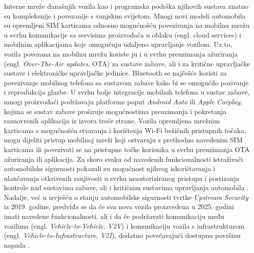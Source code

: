 \documentclass[times, utf8, diplomski, numeric]{fer}
\begin{document}
Interne mreže današnjih vozila kao i programska podrška njihovih sustava znatno su kompleksnije i povezanije s vanjskim svijetom\cite{huq2020driving}. Mnogi novi modeli automobila su opremljeni SIM karticama odnosno mogućnošću povezivanja na mobilnu mrežu u svrhu komunikacije sa servisima proizvođača u oblaku (engl. cloud services) i mobilnim aplikacijama koje omogućuju udaljeno upravljanje vozilom. Uz to, vozila povezana na mobilnu mrežu koriste ju i u svrhu preuzimanja ažuriranja (engl. \textit{Over-The-Air updates}, OTA) za sustave zabave, ali i za kritične upravljačke sustave i elektroničke upravljačke jedinice. Bluetooth se najčešće koristi za povezivanje mobilnog telefona sa sustavom zabave kako bi se omogućilo pozivanje i reprodukcija glazbe. U svrhu bolje integracije mobilnih telefona u sustav zabave, mnogi proizvođači podržavaju platforme poput \textit{Android Auto} ili \textit{Apple Carplay}, kojima se sustav zabave proširuje mogućnostima preuzimanja i pokretanja raznovrsnih aplikacija iz izvora treće strane. Vozila opremljena mrežnim karticama s mogućnošću stvaranja i korištenja Wi-Fi bežičnih pristupnih točaka, mogu dijeliti pristup mobilnoj mreži koji ostvaruju s prethodno navedenim SIM karticama ili povezivati se na pristupne točke korisnika u svrhu preuzimanja OTA ažuriranja ili aplikacija. Za skoro svaku od navedenih funkcionalnosti istraživači automobilske sigurnosti pokazali su mogućnost njihvog iskorištavanja i ulančavanja otkrivenih ranjivosti u svrhu neautoriziranog pristupa i postizanja kontrole nad sustavima zabave, ali i kritičnim sustavima upravljanja automobila \cite{nie2017free, nie2018over, cai20190, tencent2018bmw, miller2015remote, curry2023web}. Nadalje, već u izvješću o stanju automobilske sigurnosti tvrtke \textit{Upstream Security} iz 2019. godine, predviđa se da će sva nova vozila proizvedena u 2025. godini imati navedene funkcionalnosti, ali i da će podržavati komunikaciju među vozilima (engl. \textit{Vehicle-to-Vehicle, V2V}) i komunikaciju vozila s infrastrukturom (engl. \textit{Vehicle-to-Infrastructure, V2I}), dodatno povećavajući dostupnu površinu napada \cite{upstream2019report}.
\end{document}
